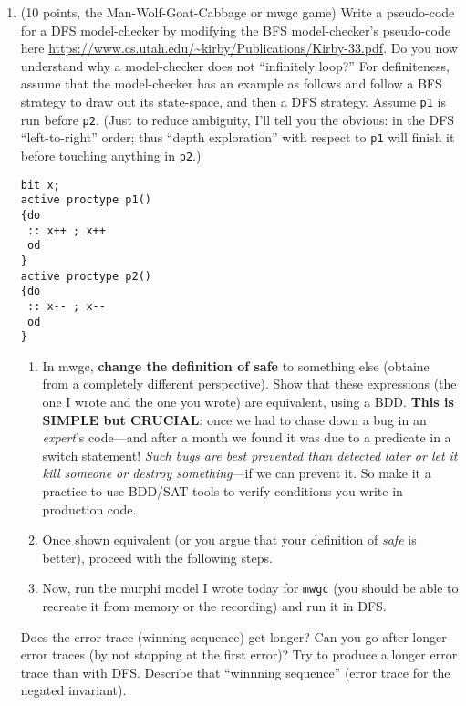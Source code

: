 \documentclass[11pt]{article}
\begin{document}
\begin{enumerate}
\item (10 points, the Man-Wolf-Goat-Cabbage or mwgc game)
  Write a pseudo-code for
  a DFS model-checker by modifying the BFS model-checker's
  pseudo-code here
  \url{https://www.cs.utah.edu/~kirby/Publications/Kirby-33.pdf}.
  Do you now understand why a model-checker does not ``infinitely loop?''
  For definiteness, assume that the model-checker has an example as follows
  and follow a BFS strategy to draw out its state-space, and then a DFS
  strategy.
  Assume {\tt p1} is run before {\tt p2}. (Just to
  reduce ambiguity, I'll tell you
  the obvious: in the DFS ``left-to-right'' order;
  thus ``depth exploration'' with respect to {\tt p1} will finish it before
  touching anything in {\tt p2}.)
  \begin{footnotesize}
  \begin{verbatim}    
bit x;
active proctype p1()
{do
 :: x++ ; x++ 
 od
}
active proctype p2()
{do
 :: x-- ; x-- 
 od
}
\end{verbatim}
  \end{footnotesize}    
  \begin{enumerate}
\item In mwgc, {\bf change the definition of safe} to something
  else (obtaine from a completely different perspective).
  Show that these expressions (the one I wrote and the
  one you wrote) are equivalent, using a BDD.
  {\bf This is SIMPLE but CRUCIAL}: once we had to chase down
  a bug in an {\em expert}'s code---and after a month we found
  it was due to a predicate in a switch statement!
  {\em Such bugs are best prevented than detected later or let
    it kill someone or destroy something}---if we can prevent it.
  So make it a practice to use BDD/SAT tools to verify conditions
  you write in production code.
\item[]   Once shown equivalent (or you argue that your definition of {\em safe}
  is better), proceed with the following steps.
  

\item  Now, run the murphi model I wrote today
  for {\tt mwgc}
  (you should be able to recreate it from
  memory or the recording) and run it in DFS.
  \end{enumerate}
  Does the error-trace (winning sequence) get longer?
  Can you go after longer error traces (by not stopping at the first error)?
  Try to produce a longer error trace than with DFS.
  Describe that ``winnning sequence'' (error trace for the negated invariant).


\end{enumerate}
\end{document}

